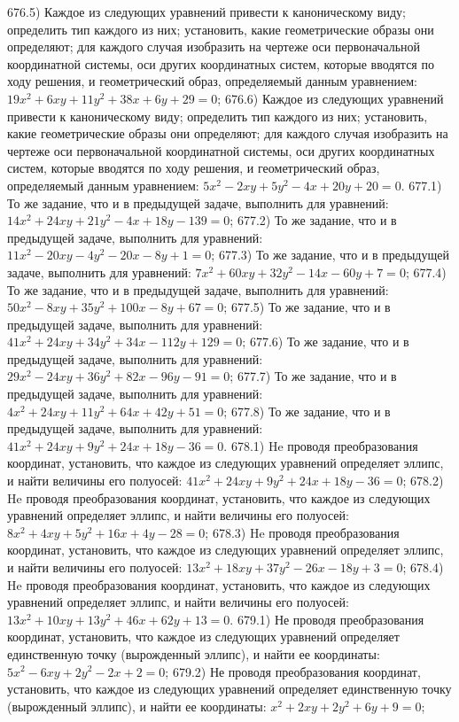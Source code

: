 676.5) Каждое из следующих уравнений привести к каноническому виду; определить тип каждого из них; установить, какие геометрические образы они определяют; для каждого случая изобразить на чертеже оси первоначальной координатной системы, оси других координатных систем, которые вводятся по ходу решения, и геометрический образ, определяемый данным уравнением: $19 x^2+6 x y+11 y^2+38 x+6 y+29=0$;
676.6) Каждое из следующих уравнений привести к каноническому виду; определить тип каждого из них; установить, какие геометрические образы они определяют; для каждого случая изобразить на чертеже оси первоначальной координатной системы, оси других координатных систем, которые вводятся по ходу решения, и геометрический образ, определяемый данным уравнением: $5 x^2-2 x y+5 y^2-4 x+20 y+20=0$.
677.1) То же задание, что и в предыдущей задаче, выполнить для уравнений: $14 x^2+24 x y+21 y^2-4 x+18 y-139=0$;
677.2) То же задание, что и в предыдущей задаче, выполнить для уравнений: $11 x^2-20 x y-4 y^2-20 x-8 y+1=0$;
677.3) То же задание, что и в предыдущей задаче, выполнить для уравнений: $7 x^2+60 x y+32 y^2-14 x-60 y+7=0$;
677.4) То же задание, что и в предыдущей задаче, выполнить для уравнений: $50 x^2-8 x y+35 y^2+100 x-8 y+67=0$;
677.5) То же задание, что и в предыдущей задаче, выполнить для уравнений: $41 x^2+24 x y+34 y^2+34 x-112 y+129=0$;
677.6) То же задание, что и в предыдущей задаче, выполнить для уравнений: $29 x^2-24 x y+36 y^2+82 x-96 y-91=0$;
677.7) То же задание, что и в предыдущей задаче, выполнить для уравнений: $4 x^2+24 x y+11 y^2+64 x+42 y+51=0$;
677.8) То же задание, что и в предыдущей задаче, выполнить для уравнений: $41 x^2+24 x y+9 y^2+24 x+18 y-36=0$.
678.1) He проводя преобразования координат, установить, что каждое из следующих уравнений определяет эллипс, и найти величины его полуосей: $41 x^2+24 x y+9 y^2+24 x+18 y-36=0$;
678.2) He проводя преобразования координат, установить, что каждое из следующих уравнений определяет эллипс, и найти величины его полуосей: $8 x^2+4 x y+5 y^2+16 x+4 y-28=0$;
678.3) He проводя преобразования координат, установить, что каждое из следующих уравнений определяет эллипс, и найти величины его полуосей: $13 x^2+18 x y+37 y^2-26 x-18 y+3=0$;
678.4) He проводя преобразования координат, установить, что каждое из следующих уравнений определяет эллипс, и найти величины его полуосей: $13 x^2+10 x y+13 y^2+46 x+62 y+13=0$.
679.1) Не проводя преобразования координат, установить, что каждое из следующих уравнений определяет единственную точку (вырожденный эллипс), и найти ее координаты: $5 x^2-6 x y+2 y^2-2 x+2=0$;
679.2) Не проводя преобразования координат, установить, что каждое из следующих уравнений определяет единственную точку (вырожденный эллипс), и найти ее координаты: $x^2+2 x y+2 y^2+6 y+9=0$;
